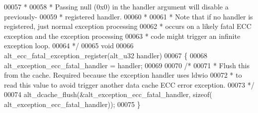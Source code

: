 \begin{DoxyCode}
00057 \textcolor{comment}{ * }
00058 \textcolor{comment}{ * Passing null (0x0) in the handler argument will disable a previously-}
00059 \textcolor{comment}{ * registered handler.}
00060 \textcolor{comment}{ *}
00061 \textcolor{comment}{ * Note that if no handler is registered, just normal exception processing}
00062 \textcolor{comment}{ * occurs on a likely fatal ECC exception and the exception processing}
00063 \textcolor{comment}{ * code might trigger an infinite exception loop.}
00064 \textcolor{comment}{ */}
00065 \textcolor{keywordtype}{void} 
00066 alt_ecc_fatal_exception_register(alt_u32 handler)
00067 \{
00068     alt_exception_ecc_fatal_handler = handler;
00069 
00070     \textcolor{comment}{/* }
00071 \textcolor{comment}{     * Flush this from the cache. Required because the exception handler uses ldwio}
00072 \textcolor{comment}{     * to read this value to avoid trigger another data cache ECC error exception.}
00073 \textcolor{comment}{     */}
00074     alt_dcache_flush(&alt_exception_ecc_fatal_handler, \textcolor{keyword}{sizeof}(
      alt_exception_ecc_fatal_handler));
00075 \}
\end{DoxyCode}
